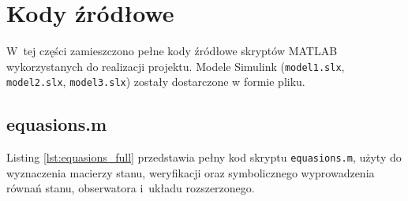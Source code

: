 \documentclass[a4paper,titlepage,11pt,floatssmall]{mwrep} %
\begin{document}
\FloatBarrier
\chapter{Kody źródłowe} \label{chap:kody}

W~tej części zamieszczono pełne kody źródłowe skryptów MATLAB wykorzystanych do realizacji projektu. Modele Simulink (\texttt{model1.slx}, \texttt{model2.slx}, \texttt{model3.slx}) zostały dostarczone w formie pliku.

\section{equasions.m}

Listing \ref{lst:equasions_full} przedstawia pełny kod skryptu \texttt{equasions.m}, użyty do wyznaczenia macierzy stanu, weryfikacji oraz symbolicznego wyprowadzenia równań stanu, obserwatora i~układu rozszerzonego.
\end{document}
